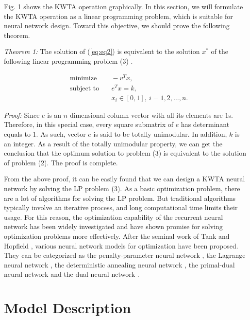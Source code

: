 \documentclass[conference]{IEEEtran}
\begin{document}
Fig. 1 shows the KWTA operation graphically. In this section, we
will formulate the KWTA operation as a linear programming problem,
which is suitable for neural network design. Toward this objective,
we should prove the following theorem.

\textit{Theorem 1:} The solution of (\ref{eq:eq2}) is equivalent to
the solution $x^{*}$ of the following linear programming problem (3)
.

\begin{equation}
\begin{array}{lll}
&\mbox{minimize}&\quad -v^{T}x,\\
&\mbox{subject to}&\quad e^{T}x=k, \\
&\mbox{}&\quad x_i\in[0,1],\   i=1,2,\ldots ,n.
\end{array}
\label{eq:eq11}
\end{equation}

\textit{Proof:} Since $e$ is an $n$-dimensional column vector with
all its elements are $1$s. Therefore, in this special case, every
square submatrix of $e$ has determinant equals to $1$. As such,
vector $e$ is said to be totally unimodular. In addition, $k$ is an
integer. As a result of the totally unimodular property, we can get
the conclusion that the optimum solution to problem (3) is
equivalent to the solution of problem (2). The proof is complete.

From the above proof, it can be easily found that we can design a
KWTA neural network by solving the LP problem (3). As a basic
optimization problem, there are a lot of algorithms for solving the
LP problem. But traditional algorithms typically involve an
iterative process, and long computational time limits their usage.
For this reason, the optimization capability of the recurrent neural
network has been widely investigated and have shown promise for
solving optimization problems more effectively. After the seminal
work of Tank and Hopfield \cite{cit:14}\cite{cit:15}, various neural
network models for optimization have been proposed. They can be
categorized as the penalty-parameter neural network \cite{cit:16},
the Lagrange neural network \cite{cit:17}, the deterministic
annealing neural network \cite{cit:18}, the primal-dual neural
network \cite{cit:19}\cite{cit:20} and the dual neural network
\cite{cit:30}\cite{cit:21}\cite{cit:22}.

\section{Model Description}
\end{document}
